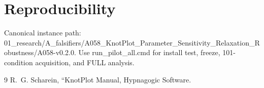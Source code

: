 \documentclass[11pt,a4paper]{article}
\begin{document}
\section{Reproducibility}
Canonical instance path: 01_research/A_falsifiers/A058_KnotPlot_Parameter_Sensitivity_Relaxation_Robustness/A058-v0.2.0. Use run_pilot_all.cmd for install test, freeze, 101-condition acquisition, and FULL analysis.
\begin{thebibliography}{9}
 R.~G. Scharein, ``KnotPlot Manual, Hypnagogic Software.
\end{thebibliography}
\end{document}
